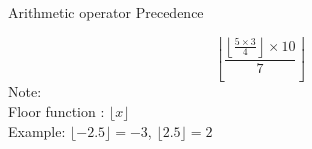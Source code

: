 \documentclass{beamer}
\begin{document}
\begin{frame}{Arithmetic operator Precedence}
    \begin{example}
        
        $$
            \left \lfloor \frac{\left \lfloor \frac{5 \times 3}{4} \right\rfloor \times 10}{7} \right \rfloor
        $$
        Note: \\
        Floor function \href{https://en.wikipedia.org/wiki/Floor_and_ceiling_functions}{} : $\lfloor x \rfloor$ \\
        Example: $\lfloor -2.5 \rfloor = -3$, $\lfloor 2.5 \rfloor = 2$
    \end{example}
\end{frame}
\end{document}
